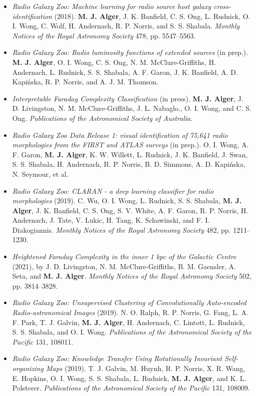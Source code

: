 \begin{itemize}
    \item \emph{Radio Galaxy Zoo: Machine learning for radio source host galaxy cross-identification} (2018). \textbf{M. J. Alger}, J. K. Banfield, C. S. Ong, L. Rudnick, O. I. Wong, C. Wolf, H. Andernach, R. P. Norris, and S. S. Shabala. \emph{Monthly Notices of the Royal Astronomy Society} 478, pp. 5547--5563.
    \item \emph{Radio Galaxy Zoo: Radio luminosity functions of extended sources} (in prep.). \textbf{M. J. Alger}, O. I. Wong, C. S. Ong, N. M. McClure-Griffiths, H. Andernach, L. Rudnick, S. S. Shabala, A. F. Garon, J. K. Banfield, A. D. Kapi\'nska, R. P. Norris, and A. J. M. Thomson.
    \item \emph{Interpretable Faraday Complexity Classification} (in press). \textbf{M. J. Alger}, J. D. Livingston, N. M. McClure-Griffiths, J. L. Nabaglo., O. I. Wong, and C. S. Ong. \emph{Publications of the Astronomical Society of Australia}.
    \item \emph{Radio Galaxy Zoo Data Release 1: visual identification of 75,641 radio morphologies from the FIRST and ATLAS surveys} (in prep.). O. I. Wong, A. F. Garon, \textbf{M. J. Alger}, K. W. Willett, L. Rudnick, J. K. Banfield, J. Swan, S. S. Shabala, H. Andernach, R. P. Norris, B. D. Simmons, A. D. Kapi\'nska, N. Seymour, et al.
    \item \emph{Radio Galaxy Zoo: CLARAN - a deep learning classifier for radio morphologies} (2019). C. Wu, O. I. Wong, L. Rudnick, S. S. Shabala, \textbf{M. J. Alger}, J. K. Banfield, C. S. Ong, S. V. White, A. F. Garon, R. P. Norris, H. Andernach, J. Tate, V. Lukic, H. Tang, K. Schawinski, and F. I. Diakogiannis. \emph{Monthly Notices of the Royal Astronomy Society} 482, pp. 1211--1230.
    \item \emph{Heightened Faraday Complexity in the inner 1 kpc of the Galactic Centre} (2021), by J. D. Livingston, N. M. McClure-Griffiths, B. M. Gaensler, A. Seta, and \textbf{M. J. Alger}. \emph{Monthly Notices of the Royal Astronomy Society} 502, pp. 3814--3828.
    \item \emph{Radio Galaxy Zoo: Unsupervised Clustering of Convolutionally Auto-encoded Radio-astronomical Images} (2019). N. O. Ralph, R. P. Norris, G. Fang, L. A. F. Park, T. J. Galvin, \textbf{M. J. Alger}, H. Andernach, C. Lintott, L. Rudnick, S. S. Shabala, and O. I. Wong. \emph{Publications of the Astronomical Society of the Pacific} 131, 108011.
    \item \emph{Radio Galaxy Zoo: Knowledge Transfer Using Rotationally Invariant Self-organizing Maps} (2019). T. J. Galvin, M. Huynh, R. P. Norris, X. R. Wang, E. Hopkins, O. I. Wong, S. S. Shabala, L. Rudnick, \textbf{M. J. Alger}, and K. L. Polsterer. \emph{Publications of the Astronomical Society of the Pacific} 131, 108009.
\end{itemize}

